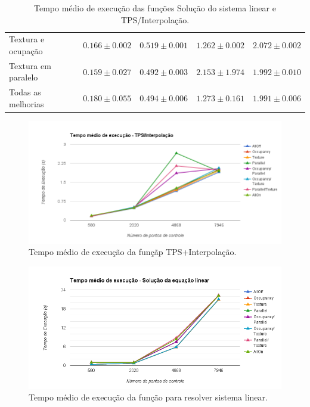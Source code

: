 \begin{table}[H]
\begin{tabular}{l*{4}{c}}
    Textura e ocupação & $0.166 \pm 0.002$ & $0.519 \pm 0.001$ & $1.262 \pm 0.002$ & $2.072 \pm 0.002$ \\
    Textura em paralelo & $0.159 \pm 0.027$ & $0.492 \pm 0.003$ & $2.153 \pm 1.974$ & $1.992 \pm 0.010$ \\
    Todas as melhorias & $0.180 \pm 0.055$ & $0.494 \pm 0.006$ & $1.273 \pm 0.161$ & $1.991 \pm 0.006$ \\
    \bottomrule
\end{tabular}
  \caption{Tempo médio de execução das funções Solução do sistema linear e TPS/Interpolação.}
  \label{table:resultsAll}
\end{table}
\normalsize

\begin{figure}[H]
    \centering
      \includegraphics[width=1.1\textwidth]{figuras/chartTPS.png}
    \caption{Tempo médio de execução da funçãp TPS+Interpolação.}
    \label{fig:chartTPS}
\end{figure}

\begin{figure}[H]
    \centering
    \includegraphics[width=1.1\textwidth]{figuras/chartSolver.png}
    \caption{Tempo médio de execução da função para resolver sistema linear.}
    \label{fig:chartSolver}
\end{figure}


